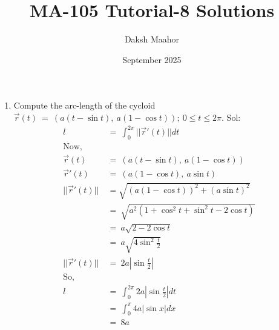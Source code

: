 \documentclass[14pt]{extarticle}
\title{\vspace{-3cm}MA-105 Tutorial-8 Solutions}
\author{Daksh Maahor}
\date{September 2025}
\begin{document}
\maketitle

\begin{enumerate}
    \item Compute the arc-length of the cycloid $\vec{r}(t) \ = \ (a(t-\sin{t}), \ a(1-\cos{t})); \ 0 \leq t \leq 2\pi$.
    \newline \hfill \newline
    Sol:
    \begin{align*}
        l \ &= \ \int_{0}^{2\pi} ||\vec{r}'(t)|| dt \\
        \text{Now, } \\
        \vec{r}(t) \ &= \ (a(t-\sin{t}), \ a(1-\cos{t})) \\
        \vec{r}'(t) \ &= \ (a(1-\cos{t}), \ a\sin{t}) \\
        ||\vec{r}'(t)|| &= \sqrt{(a(1-\cos{t}))^2 + (a\sin{t})^2} \\
        &= \ \sqrt{a^2(1+\cos^2{t}+\sin^2{t-2\cos{t}})} \\
        &= \ a\sqrt{2-2\cos{t}} \\
        &= \ a\sqrt{4\sin^2{\frac{t}{2}}} \\
        ||\vec{r}'(t)|| \ &= \ 2a\left | \sin{\frac{t}{2}} \right | \\
        \text{So, } \\
        l \ &= \ \int_{0}^{2\pi} 2a\left | \sin{\frac{t}{2}} \right | dt \\
        &= \ \int_{0}^{\pi} 4a |\sin{x}| dx \\ 
        &= \ 8a
    \end{align*}


\end{enumerate}
\end{document}

